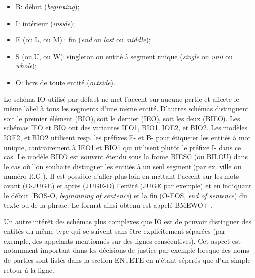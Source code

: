 \begin{itemize}
	\item B:  début (\textit{beginning});
	\item I: intérieur (\textit{inside});
	\item E (ou L, ou M) : fin (\textit{end} ou \textit{last} ou \textit{middle});
	\item S (ou U, ou W): singleton ou entité à segment unique (\textit{single} ou \textit{unit} ou \textit{whole});
	\item O: hors de toute entité (\textit{outside}).
\end{itemize}

Le schéma IO utilisé par défaut ne met l'accent sur aucune partie et affecte le même label à tous les segments d'une même entité. D'autres schémas distinguent soit le premier élément (BIO), soit le dernier (IEO), soit les deux (BIEO). Les schémas IEO et BIO ont des variantes IEO1, BIO1, IOE2, et BIO2. Les modèles IOE2, et BIO2 utilisent resp. les préfixes E- et B- pour étiqueter les entités à mot unique, contrairement à IEO1 et BIO1 qui utilisent plutôt le préfixe I- dans ce cas. Le modèle BIEO est souvent étendu sous la forme BIESO (ou BILOU) dans le cas où l'on souhaite distinguer les entités à un seul segment (par ex. ville ou numéro R.G.). Il est possible d'aller plus loin en mettant l'accent sur les mots avant  (O-JUGE) et après (JUGE-O) l'entité (JUGE par exemple) et en indiquant le début (BOS-O, \textit{begininning of sentence}) et la fin (O-EOS, \textit{end of sentence}) du texte ou de la phrase. Le format ainsi obtenu est appelé BMEWO+ \citep{baldwin2009bmewo}.

Un autre intérêt des schémas plus complexes que IO est de pouvoir distinguer des entités du même type qui se suivent sans être explicitement séparées (par exemple, des appelants mentionnés sur des lignes consécutives). Cet aspect est notamment important dans les décisions de justice par exemple lorsque des noms de parties sont listés dans la section ENTETE en n'étant séparés que d'un simple retour à la ligne.

